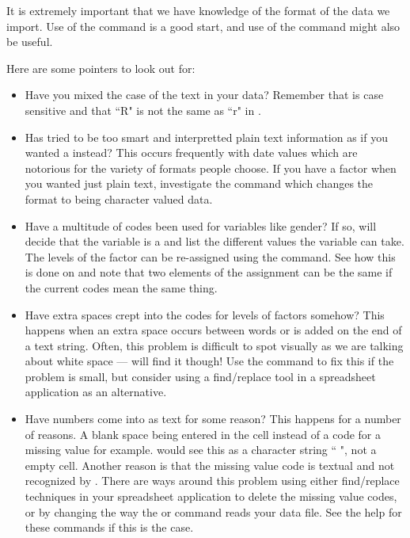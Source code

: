 It is extremely important that we have knowledge of the format of the data we import. Use of the  command is a good start, and use of the  command might also be useful. 
 
Here are some pointers to look out for:\begin{itemize} 
 
\item Have you mixed the case of the text in your data? Remember that \R{} is case sensitive and that ``R" is not the same as ``r" in \R{}. 
 
\item Has \R{} tried to be too smart and interpretted plain text information as if you wanted a  instead? This occurs frequently with date values which are notorious for the variety of formats people choose. If you have a factor when you wanted just plain text, investigate the  command which changes the format to being character valued data. 
\item Have a multitude of codes been used for variables like gender? If so, \R{} will decide that the variable is a  and list the different values the variable can take. The levels of the factor can be re-assigned using the  command. See how this is done on \pageref{UseOfLevels} and note that two elements of the assignment can be the same if the current codes mean the same thing. 
\item Have extra spaces crept into the codes for levels of factors somehow? This happens when an extra space occurs between words or is added on the end of a text string. Often, this problem is difficult to spot visually as we are talking about white space --- \R{} will find it though! Use the  command to fix this if the problem is small, but consider using a find/replace tool in a spreadsheet application as an alternative. 
\item Have numbers come into \R{} as text for some reason? This happens for a number of reasons. A blank space being entered in the cell instead of a code for a missing value for example. \R{} would see this as a character string `` ", not a empty cell. Another reason is that the missing value code is textual and not recognized by \R{}. There are ways around this problem using either find/replace techniques in your spreadsheet application to delete the missing value codes, or by changing the way the  or  command reads your data file. See the help for these commands if this is the case. 
\end{itemize} 
 
 
 
 
 

